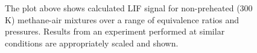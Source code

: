 \begin{figure}

\centering



\caption[Methane-air flame results - I]{The plot above shows calculated LIF signal for non-preheated (300 K) methane-air mixtures over a range of equivalence ratios and pressures. Results from an experiment performed at similar conditions are appropriately scaled and shown.}

\label{fig:01-300}

\end{figure}
